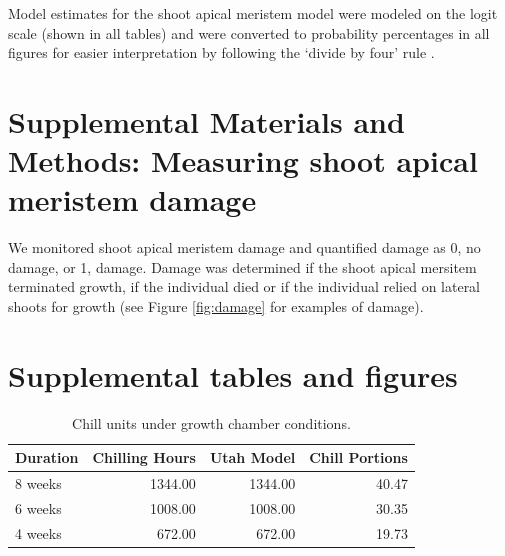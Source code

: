 \documentclass{article}\usepackage[]{graphicx}\usepackage[]{color}
\begin{document}
Model estimates for the shoot apical meristem model were modeled on the logit scale (shown in all tables) and were converted to probability percentages in all figures for easier interpretation by following the `divide by four' rule \citep{Gelman2006}.

\section*{Supplemental Materials and Methods: Measuring shoot apical meristem damage}

We monitored shoot apical meristem damage and quantified damage as 0, no damage, or 1, damage. Damage was determined if the shoot apical mersitem terminated growth, if the individual died or if the individual relied on lateral shoots for growth (see Figure \ref{fig:damage} for examples of damage). 



\section*{Supplemental tables and figures}


\begin{table}[H]
\centering
\caption{Chill units under growth chamber conditions.} 
\label{tab:chillcalc}
\begin{tabular}{lrrr}
  \hline
Duration & Chilling Hours & Utah Model & Chill Portions \\ 
  \hline
8 weeks & 1344.00 & 1344.00 & 40.47 \\ 
  6 weeks & 1008.00 & 1008.00 & 30.35 \\ 
  4 weeks & 672.00 & 672.00 & 19.73 \\ 
   \hline
\end{tabular}
\end{table}
\end{document}
